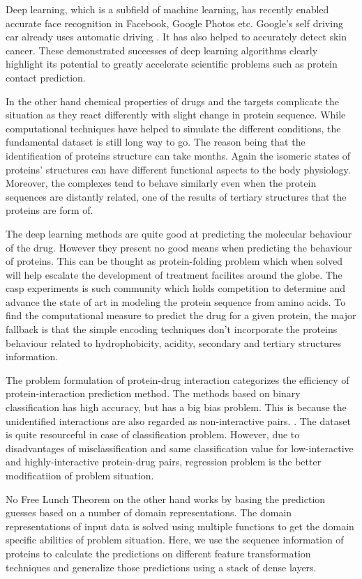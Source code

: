 Deep learning, which is a subfield of machine learning, has recently enabled accurate face recognition in Facebook, Google Photos etc. Google’s self driving car already uses automatic driving \cite{Becker2008}. It has also helped to accurately detect skin cancer. These demonstrated successes of deep learning algorithms clearly highlight its potential to greatly accelerate scientific problems such as protein contact prediction. 

In the other hand chemical properties of drugs and the targets complicate the situation as they react differently with slight change in protein sequence. While computational techniques have helped to simulate the different conditions, the fundamental dataset is still long way to go. The reason being that the identification of proteins structure can take months. Again the isomeric states of proteins' structures can have different functional aspects to the body physiology. Moreover, the complexes tend to behave similarly even when the protein sequences are distantly related, one of the results of tertiary structures that the proteins are form of. \cite{Choudhuri2014}

The deep learning methods are quite good at predicting the molecular behaviour of the drug. However they present no good means when predicting the behaviour of proteins. This can be thought as protein-folding problem which when solved will help escalate the development of treatment facilites around the globe. The \acrfull{casp} experiments is such community which holds competition to determine and advance the state of art in modeling the protein sequence from amino acids.\cite{Gooch2011} To find the computational measure to predict the drug for a given protein, the major fallback is that the simple encoding techniques don’t incorporate the proteins behaviour related to hydrophobicity, acidity, secondary and tertiary structures information.\cite{Wong2018}

The problem formulation of protein-drug interaction categorizes the efficiency of protein-interaction prediction method. The methods based on binary classification has high accuracy, but has a big bias problem. This is because the unidentified interactions are also regarded as non-interactive pairs. \cite{Mahato2016,Tang2013}. The dataset is quite resourceful in case of classification problem. However, due to disadvantages of misclassification and same classification value for low-interactive and highly-interactive protein-drug pairs, regression problem is the better modificatiion of problem situation. \cite{Tang2013}

No Free Lunch Theorem \cite{Wolpert2005} on the other hand works by basing the prediction guesses based on a number of domain representations. The domain representations of input data is solved using multiple functions to get the domain specific abilities of problem situation. Here, we use the sequence information of proteins to calculate the predictions on different feature transformation techniques and generalize those predictions using a stack of dense layers.
